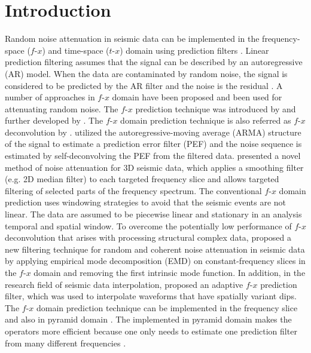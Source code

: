 \section{Introduction}
Random noise attenuation in seismic data can be implemented in the 
frequency-space ($f$-$x$) and time-space ($t$-$x$) domain using prediction filters \cite[]{Abma1995}.
Linear prediction filtering assumes that the 
signal can be described by an autoregressive (AR) model. When the data are 
contaminated by random noise, the signal is considered to be predicted by 
the AR filter and the noise is the residual \cite[]{Bekara2009}. 
A number of approaches in $f$-$x$ domain have been proposed and been used for 
attenuating random noise. The $f$-$x$ prediction technique was introduced by 
\cite{Canales1984} and further developed by \cite{Gulunay1986}. The $f$-$x$ domain 
prediction technique is also referred as $f$-$x$ deconvolution by \cite{Gulunay1986}. 
\cite{Sacchi2001} utilized the autoregressive-moving average (ARMA) 
structure of the signal to estimate a prediction error filter (PEF) and 
the noise sequence is estimated by self-deconvolving the PEF from the 
filtered data. \cite{Hodgson2002} presented a novel method of noise
 attenuation for 3D seismic data, which applies a smoothing filter 
(e.g. 2D median filter) to each targeted frequency slice and allows 
targeted filtering of selected parts of the frequency spectrum. The 
conventional $f$-$x$ domain prediction uses windowing strategies to avoid 
that the seismic events are not linear. The data are assumed to be 
piecewise linear and stationary in an analysis temporal and spatial 
window. To overcome the potentially low performance of $f$-$x$ deconvolution
that arises with processing structural complex data, \cite{Bekara2009} 
proposed a new filtering technique for random and 
coherent noise attenuation in seismic data by applying empirical 
mode decomposition (EMD) \cite[]{Huang1998} on constant-frequency
slices in the $f$-$x$ domain and removing the first intrinsic mode 
function. In addition, in the research field of seismic data 
interpolation, \cite{Naghizadeh2009} proposed an adaptive
$f$-$x$ prediction filter, which was used to interpolate waveforms 
that have spatially variant dips. The $f$-$x$ domain prediction 
technique can be implemented in the frequency slice and also
in pyramid domain \cite[]{Sun1996}. The implemented in 
pyramid domain makes the operators more efficient because one
only needs to estimate one prediction filter from many different 
frequencies \cite[]{Sun1996, Hung2004, Guitton2010}.

